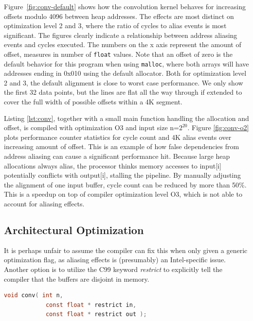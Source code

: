 \documentclass[a4paper,10pt,twocolumn,twoside]{article}
\begin{document}
{Figure~\ref{fig:conv-default} shows how the convolution kernel behaves for increasing offsets modulo 4096 between heap addresses.
The effects are most distinct on optimization level 2 and 3, where the ratio of cycles to alias events is most significant.
The figures clearly indicate a relationship between address aliasing events and cycles executed.
The numbers on the x axis represent the amount of offset, measures in number of \texttt{float} values.
Note that an offset of zero is the default behavior for this program when using \texttt{malloc}, where both arrays will have addresses ending in 0x010 using the default allocator.
Both for optimization level 2 and 3, the default alignment is close to worst case performance. 
We only show the first 32 data points, but the lines are flat all the way through if extended to cover the full width of possible offsets within a 4K segment.


Listing \ref{lst:conv}, together with a small main function handling the allocation and offset, is compiled with optimization O3 and input size n=$2^{20}$.
Figure \ref{fig:conv-o2} plots performance counter statistics for cycle count and 4K alias events over increasing amount of offset.
This is an example of how false dependencies from address aliasing can cause a significant performance hit.
Because large heap allocations always alias, the processor thinks memory accesses to input[i] potentially conflicts with output[i], stalling the pipeline.
By manually adjusting the alignment of one input buffer, cycle count can be reduced by more than 50\%.
This is a speedup on top of compiler optimization level O3, which is not able to account for aliasing effects.


\subsection{Architectural Optimization}
It is perhaps unfair to assume the compiler can fix this when only given a generic optimization flag, as aliasing effects is (presumably) an Intel-specific issue.
Another option is to utilize the C99 keyword \emph{restrict} to explicitly tell the compiler that the buffers are disjoint in memory.

\begin{lstlisting}[language=C]
void conv( int n,
            const float * restrict in,
            const float * restrict out );
\end{lstlisting}

}
\end{document}
